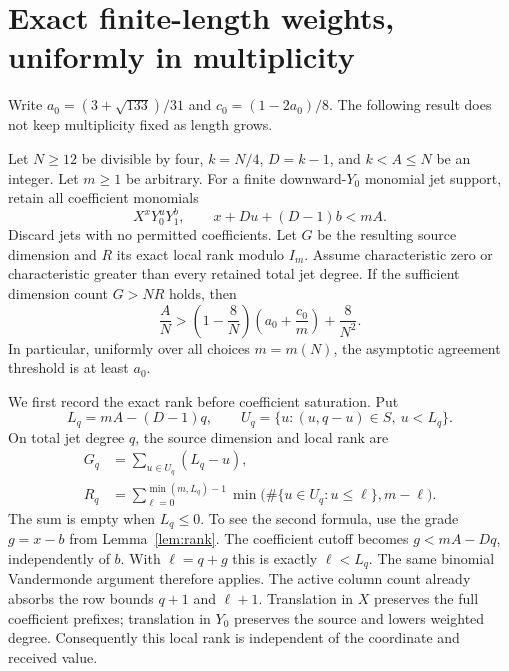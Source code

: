 \section{Exact finite-length weights, uniformly in multiplicity}\label{sec:finite-length}

Write $a_0=(3+\sqrt{133})/31$ and $c_0=(1-2a_0)/8$.
The following result does not keep multiplicity fixed as length grows.

\begin{theorem}
Let $N\ge12$ be divisible by four, $k=N/4$, $D=k-1$, and
$k<A\le N$ be an integer. Let $m\ge1$ be arbitrary. For a finite
downward-$Y_0$ monomial jet support, retain all coefficient monomials
\[
 X^xY_0^uY_1^b,\qquad x+Du+(D-1)b<mA.
\]
Discard jets with no permitted coefficients. Let $G$ be the resulting
source dimension and $R$ its exact local rank modulo $I_m$. Assume
characteristic zero or characteristic greater than every retained total
jet degree. If the sufficient dimension count $G>NR$ holds, then
\begin{equation}\label{eq:uniform-finite}
 \frac AN>\left(1-\frac8N\right)
 \left(a_0+\frac{c_0}{m}\right)+\frac8{N^2}.
\end{equation}
In particular, uniformly over all choices $m=m(N)$, the asymptotic
agreement threshold is at least $a_0$.
\end{theorem}

We first record the exact rank before coefficient saturation. Put
\[
 L_q=mA-(D-1)q,\qquad
 U_q=\{u:(u,q-u)\in S,\ u<L_q\}.
\]
On total jet degree $q$, the source dimension and local rank are
\begin{align}
 G_q&=\sum_{u\in U_q}(L_q-u),\label{eq:cutoff-dimension}\\
 R_q&=\sum_{\ell=0}^{\min(m,L_q)-1}
 \min\bigl(\#\{u\in U_q:u\le\ell\},m-\ell\bigr).
 \label{eq:cutoff-rank}
\end{align}
The sum is empty when $L_q\le0$. To see the second formula, use the
grade $g=x-b$ from Lemma~\ref{lem:rank}. The coefficient cutoff becomes
$g<mA-Dq$, independently of $b$. With $\ell=q+g$ this is exactly
$\ell<L_q$. The same binomial Vandermonde argument therefore applies.
The active column count already absorbs the row bounds $q+1$ and
$\ell+1$. Translation in $X$ preserves the full coefficient prefixes;
translation in $Y_0$ preserves the source and lowers weighted degree.
Consequently this local rank is independent of the coordinate and
received value.


